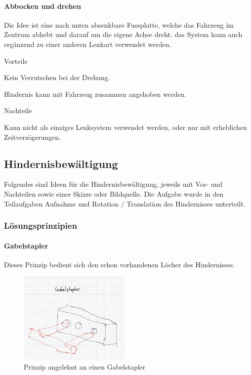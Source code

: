 \documentclass[../main.tex]{subfiles}
\begin{document}
\paragraph{Abbocken und drehen} \label{recherche-abbocken-und-drehen}

Die Idee ist eine nach unten absenkbare Fussplatte, welche das Fahrzeug im Zentrum abhebt und darauf um die eigene Achse dreht. das System kann auch ergänzend zu einer anderen Lenkart verwendet werden.

\begin{minipage}[t]{0.48\textwidth}
    \begin{items}
      \item [Vorteile]
      \item Kein Verrutschen bei der Drehung.
      \item Hindernis kann mit Fahrzeug zusammen angehoben werden.
 \end{items}
\end{minipage}
\hfill
\begin{minipage}[t]{0.48\textwidth}
    \begin{items}
      \item [Nachteile]
      \item Kann nicht als einziges Lenksystem verwendet werden, oder nur mit erheblichen Zeitverzögerungen.
    \end{items}
\end{minipage}

\newpage
\subsection{Hindernisbewältigung}
Folgendes sind Ideen für die Hindernisbewältigung, jeweils mit Vor- und Nachteilen sowie einer Skizze oder Bildquelle. Die Aufgabe wurde in den Teilaufgaben Aufnahme und Rotation / Translation des Hindernisses unterteilt. 

\subsubsection{Lösungsprinzipien}
\paragraph{Gabelstapler}
Dieses Prinzip bedient sich den schon vorhandenen Löcher des Hindernisses.

\begin{figure}[h!]
        \centering
        \includegraphics[width=0.48\textwidth]{img/technologierecherche/Aufnahme/Gabelstapler.jpg}
        \caption{Prinzip angelehnt an einen Gabelstapler}
        \label{img:tech_Gaplerstapler}
\end{figure}
\end{document}
